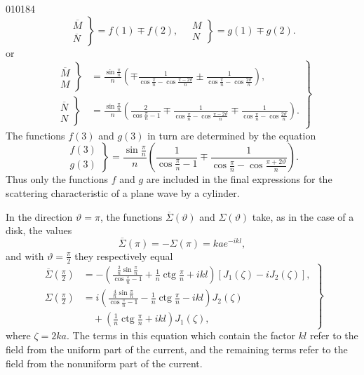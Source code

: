 \begin{scanpage}{0101}{84}
\[\left.\begin{matrix}\overline M\\\overline N\end{matrix}\right\}=f(1)\mp f(2),\quad\left.\begin{matrix}M\\N\end{matrix}\right\}=g(1)\mp g(2).\tag{15.03}\]
or
\[\left.\begin{aligned}
\left.\begin{matrix}\overline M\\M\end{matrix}\right\}&=\frac{\sin\frac\pi n}n\left(\mp\frac1{\cos\frac\pi n-\cos\frac{\pi-2\vartheta}n}\pm\frac1{\cos\frac\pi n-\cos\frac{2\vartheta}n}\right),\\
\left.\begin{matrix}\overline N\\N\end{matrix}\right\}&=\frac{\sin\frac\pi n}n\left(\frac2{\cos\frac\pi n-1}\mp\frac1{\cos\frac\pi n-\cos\frac{\pi-2\vartheta}n}\mp\frac1{\cos\frac\pi n-\cos\frac{2\vartheta}n}\right).
\end{aligned}\right\}\tag{15.04}\]
The functions $f(3)$ and $g(3)$ in turn are determined by the equation
\[\left.\begin{matrix}f(3)\\g(3)\end{matrix}\right\}=\frac{\sin\frac\pi n}n\left(\frac1{\cos\frac\pi n-1}\mp\frac1{\cos\frac\pi n-\cos\frac{\pi+2\vartheta}n}\right).\tag{15.05}\]
Thus only the functions $f$ and $g$ are included in the final expressions for the scattering characteristic of a plane wave by a cylinder.

In the direction $\vartheta=\pi$, the functions $\overline\Sigma(\vartheta)$ and $\Sigma(\vartheta)$ take, as in the case of a disk, the values
\[\overline\Sigma(\pi)=-\Sigma(\pi)=kae^{-ikl},\tag{15.06}\]
and with $\vartheta=\frac\pi2$ they respectively equal
\[\left.\begin{aligned}
\overline\Sigma\left(\frac\pi2\right)&=-\left(\frac{\frac2n\sin\frac\pi n}{\cos\frac\pi n-1}+\frac1n\operatorname{ctg}\frac\pi n+ikl\right)[J_1(\zeta)-iJ_2(\zeta)],\\
\Sigma\left(\frac\pi2\right)&=i\left(\frac{\frac4n\sin\frac\pi n}{\cos\frac\pi n-1}-\frac1n\operatorname{ctg}\frac\pi n-ikl\right)J_2(\zeta)\\
&\quad+\left(\frac1n\operatorname{ctg}\frac\pi n+ikl\right)J_1(\zeta),
\end{aligned}\right\}\tag{15.07}\]
where $\zeta=2ka$. The terms in this equation which contain the factor $kl$ refer to the field from the uniform part of the current, and the remaining terms refer to the field from the nonuniform part of the current.
\end{scanpage}
